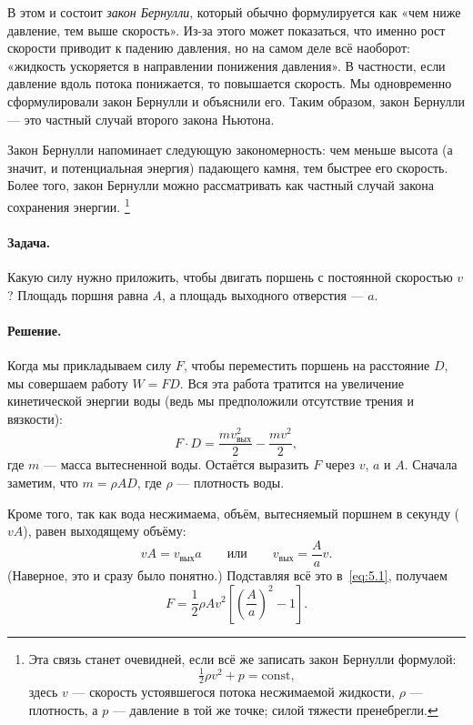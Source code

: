 В этом и состоит \label{эффект Бернулли}\emph{закон Бернулли}, который обычно формулируется как «чем ниже давление, тем выше скорость».
Из-за этого может показаться, что именно рост скорости приводит к падению давления, но на самом деле всё наоборот: «жидкость ускоряется в направлении понижения давления».
В частности, если давление вдоль потока понижается, то повышается скорость.
Мы одновременно сформулировали закон Бернулли и объяснили его.
Таким образом, закон Бернулли --- это частный случай второго закона Ньютона.


Закон Бернулли напоминает следующую закономерность: чем меньше высота (а значит, и потенциальная энергия) падающего камня, тем быстрее его скорость.
Более того, закон Бернулли можно рассматривать как частный случай закона сохранения энергии.%
\footnote{Эта связь станет очевидней, если всё же записать закон Бернулли формулой: \[\tfrac12\rho v^2+p=\text{const},\]
здесь $v$ --- скорость устоявшегося потока несжимаемой жидкости, $\rho$ --- плотность, а $p$ --- давление в той же точке; силой тяжести пренебрегли.\pr}

\paragraph{Задача.}
Какую силу нужно приложить, чтобы двигать поршень с постоянной скоростью $v$?
Площадь поршня равна $A$, а площадь выходного отверстия --- $a$.

\paragraph{Решение.}
Когда мы прикладываем силу $F$, чтобы переместить поршень на расстояние $D$, мы совершаем работу $W=F D$.
Вся эта работа тратится на увеличение кинетической энергии воды (ведь мы предположили отсутствие трения и вязкости):
\begin{equation}
F \cdot D=\frac{m v_{\text{вых}}^{2}}{2}-\frac{m v^{2}}{2},
\label{eq:5.1}
\end{equation}
где $m$ --- масса вытесненной воды.
Остаётся выразить $F$ через $v$, $a$ и $A$.
Сначала заметим, что $m=\rho A D$, где $\rho$ --- плотность воды.

Кроме того, так как вода несжимаема, объём, вытесняемый поршнем в секунду ($vA$), равен выходящему объёму:
\[
vA=v_{\text{вых}} a
\qquad\text{или}\qquad
v_{\text{вых}}=\frac{A}{a} v.
\]
(Наверное, это и сразу было понятно.)
Подставляя всё это в~\eqref{eq:5.1}, получаем
\begin{equation}
F=\frac12\rho A v^{2} \left[ \left(\frac{A}{a}\right)^2-1\right].
\label{eq:5.2}
\end{equation}

